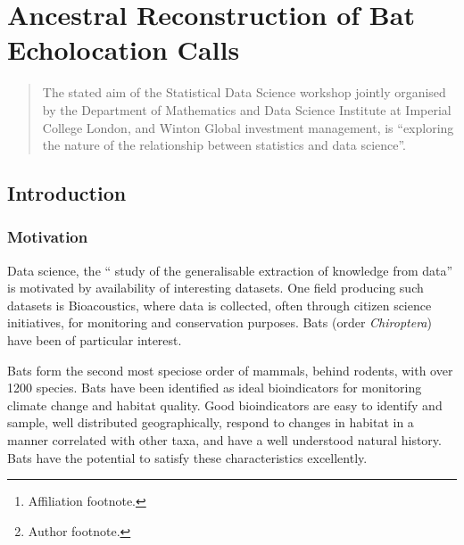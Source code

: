 \documentclass{ws-rv9x6}
\begin{document}
\chapter[Ancestral Reconstruction of Bat Echolocation Calls]{Ancestral Reconstruction of Bat Echolocation Calls}\label{ra_ch1}

\author[J.P. Meagher et al.]{J.P. Meagher\footnote{Author footnote.}}

\address{Department of Statistics,\\
University of Warwick, \\
J.Meagher@Warwick.ac.uk\footnote{Affiliation footnote.}}

\begin{abstract}
The stated aim of the Statistical Data Science workshop jointly organised by the Department of Mathematics and Data Science Institute at Imperial College London, and Winton Global investment management, is ``exploring the nature of the relationship between statistics and data science''. 
\end{abstract}
\body


\section{Introduction}

\subsection{Motivation}
Data science, the `` study of the generalisable extraction of knowledge from data'' \cite{dhar2013data} is motivated by availability of interesting datasets. One field producing such datasets is Bioacoustics, where data is collected, often through citizen science \cite{kullenberg2016citizen} initiatives, for monitoring and conservation purposes.\cite{allen2006citizen} Bats (order \textit{Chiroptera}) have been of particular interest.\cite{pettorelli2013indicator} 

Bats form the second most speciose order of mammals, behind rodents, with over 1200 species. \cite{simmons2005order} Bats have been identified as ideal bioindicators for monitoring climate change and habitat quality.\cite{jones2009carpe} Good bioindicators are easy to identify and sample, well distributed geographically, respond to changes in habitat in a manner correlated with other taxa, and have a well understood natural history.\cite{moreno2007shortcuts} Bats have the potential to satisfy these characteristics excellently.
\end{document}
